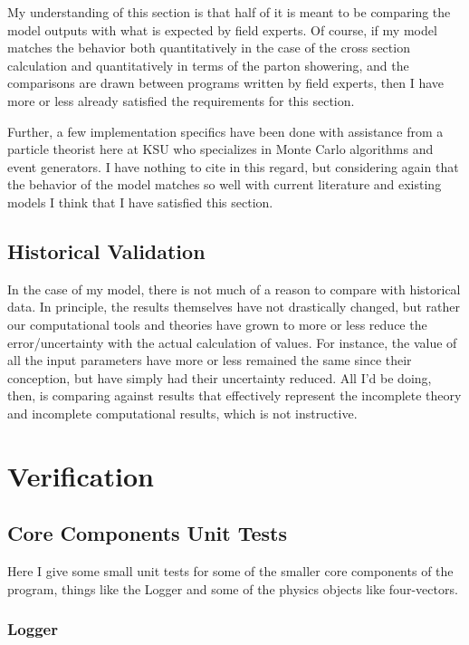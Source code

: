 My understanding of this section is that half of it is meant to be comparing the model outputs with what is expected by field experts. Of course, if my model matches the behavior both quantitatively in the case of the cross section calculation and quantitatively in terms of the parton showering, and the comparisons are drawn between programs written by field experts, then I have more or less already satisfied the requirements for this section.

Further, a few implementation specifics have been done with assistance from a particle theorist here at KSU who specializes in Monte Carlo algorithms and event generators. I have nothing to cite in this regard, but considering again that the behavior of the model matches so well with current literature and existing models I think that I have satisfied this section.



\subsection{Historical Validation}

In the case of my model, there is not much of a reason to compare with historical data. In principle, the results themselves have not drastically changed, but rather our computational tools and theories have grown to more or less reduce the error/uncertainty with the actual calculation of values. For instance, the value of all the input parameters have more or less remained the same since their conception, but have simply had their uncertainty reduced. All I'd be doing, then, is comparing against results that effectively represent the incomplete theory and incomplete computational results, which is not instructive.

\section{Verification}

\subsection{Core Components Unit Tests}

Here I give some small unit tests for some of the smaller core components of the program, things like the Logger and some of the physics objects like four-vectors.

\subsubsection{Logger}

